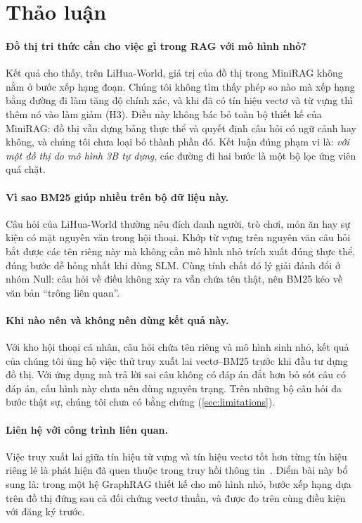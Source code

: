 \section{Thảo luận}\label{sec:discussion}

\paragraph{Đồ thị tri thức cần cho việc gì trong RAG với mô hình nhỏ?}
Kết quả cho thấy, trên LiHua-World, giá trị của đồ thị trong MiniRAG không nằm ở bước xếp hạng đoạn.
Chúng tôi không tìm thấy phép so nào mà xếp hạng bằng đường đi làm tăng độ chính xác, và khi đã có tín hiệu vectơ và từ vựng thì thêm nó vào làm giảm (H3).
Điều này không bác bỏ toàn bộ thiết kế của MiniRAG: đồ thị vẫn dựng bảng thực thể và quyết định câu hỏi có ngữ cảnh hay không, và chúng tôi chưa loại bỏ thành phần đó.
Kết luận đúng phạm vi là: \emph{với một đồ thị do mô hình 3B tự dựng}, các đường đi hai bước là một bộ lọc ứng viên quá chặt.

\paragraph{Vì sao BM25 giúp nhiều trên bộ dữ liệu này.}
Câu hỏi của LiHua-World thường nêu đích danh người, trò chơi, món ăn hay sự kiện có mặt nguyên văn trong hội thoại.
Khớp từ vựng trên nguyên văn câu hỏi bắt được các tên riêng này mà không cần mô hình nhỏ trích xuất đúng thực thể, đúng bước dễ hỏng nhất khi dùng SLM.
Cùng tính chất đó lý giải đánh đổi ở nhóm Null: câu hỏi về điều không xảy ra vẫn chứa tên thật, nên BM25 kéo về văn bản ``trông liên quan''.

\paragraph{Khi nào nên và không nên dùng kết quả này.}
Với kho hội thoại cá nhân, câu hỏi chứa tên riêng và mô hình sinh nhỏ, kết quả của chúng tôi ủng hộ việc thử truy xuất lai vectơ--BM25 trước khi đầu tư dựng đồ thị.
Với ứng dụng mà trả lời sai câu không có đáp án đắt hơn bỏ sót câu có đáp án, cấu hình này chưa nên dùng nguyên trạng.
Trên những bộ câu hỏi đa bước thật sự, chúng tôi chưa có bằng chứng (\cref{sec:limitations}).

\paragraph{Liên hệ với công trình liên quan.}
Việc truy xuất lai giữa tín hiệu từ vựng và tín hiệu vectơ tốt hơn từng tín hiệu riêng lẻ là phát hiện đã quen thuộc trong truy hồi thông tin~\cite{cormack2009rrf}.
Điểm bài này bổ sung là: trong một hệ GraphRAG thiết kế cho mô hình nhỏ, bước xếp hạng dựa trên đồ thị đứng sau cả đối chứng vectơ thuần, và được đo trên cùng điều kiện với đăng ký trước.
